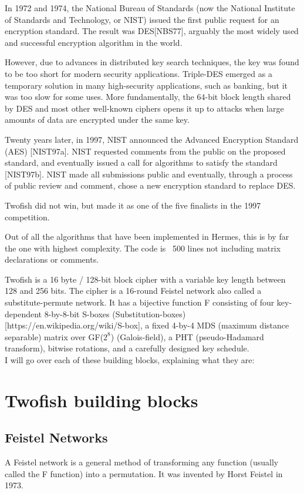 In 1972 and 1974, the National Bureau of Standards (now the National Institute of Standards and Technology, or NIST) issued the first public request for an encryption standard. The result was DES[NBS77], arguably the most widely used and successful encryption algorithm in the world.

However, due to advances in distributed key search techniques, the key was found to be too short for modern security applications.
Triple-DES emerged as a temporary solution in many high-security applications, such as banking, but it was too slow for some uses. More fundamentally, the 64-bit block length shared by DES and most other well-known ciphers opens it up to attacks when large amounts of data are encrypted under the same key.

Twenty years later, in 1997, NIST announced the Advanced Encryption Standard (AES) [NIST97a]. NIST requested comments from the public on the proposed standard, and eventually issued a call for algorithms to satisfy the standard [NIST97b]. NIST made all submissions public and eventually, through a process of public review and comment, chose a new encryption standard to replace DES.

Twofish did not win, but made it as one of the five finalists in the 1997 competition.

Out of all the algorithms that have been implemented in Hermes, this is by far the one with highest complexity. The code is ~500 lines not including matrix declarations or comments.

Twofish is a 16 byte / 128-bit block cipher with a variable key length between 128 and 256 bits. The cipher is a 16-round Feistel network also called a substitute-permute network. It has a bijective function F consisting of four key-dependent 8-by-8-bit S-boxes (Substitution-boxes)[https://en.wikipedia.org/wiki/S-box], a fixed 4-by-4 MDS (maximum distance separable) matrix over GF($2^8$) (Galois-field), a PHT (pseudo-Hadamard transform), bitwise rotations, and a carefully designed key schedule. \\

I will go over each of these building blocks, explaining what they are:
\section{Twofish building blocks}
\subsection{Feistel Networks}
A Feistel network is a general method of transforming any function (usually called the F function) into a permutation. It was invented by Horst Feistel in 1973.

